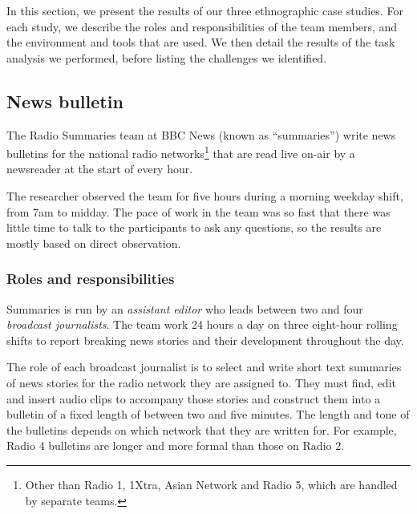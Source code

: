 In this section, we present the results of our three ethnographic case studies. For each study, we describe the roles and responsibilities of the team members, and the environment and tools that are used. We then detail the results of the task analysis we performed, before listing the challenges we identified.


\subsection{News bulletin}\label{sec:news}
The Radio Summaries team at BBC News (known as ``summaries'') write news bulletins for the national radio
networks\footnote{Other than Radio 1, 1Xtra, Asian Network and Radio 5, which are handled by separate teams.} that are read live on-air by a newsreader at the start of every hour.

The researcher observed the team for five hours during a morning weekday shift, from 7am to midday. The pace of work in the team was so fast that there was little time to talk to the participants to ask any questions, so the results are mostly based on direct observation.

\subsubsection{Roles and responsibilities}\label{sec:news-roles}
Summaries is run by an \textit{assistant editor} who leads between two and four \textit{broadcast journalists}. The team work 24 hours a day on three eight-hour rolling shifts to report breaking news stories and their development throughout the day.

The role of each broadcast journalist is to select and write short text summaries of news stories for the radio network they are assigned to. They must find, edit and insert audio clips to accompany those stories and construct them into a bulletin of a fixed length of between two and five minutes. The length and tone of the bulletins depends on which network that they are written for. For example, Radio 4 bulletins are longer and more formal than those on Radio 2.

